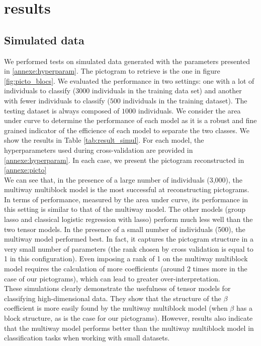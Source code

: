 \documentclass[preprint,12pt]{elsarticle}
\begin{document}
\newpage
\section{results}
\label{sec:results}
\subsection{Simulated data}
\noindent We performed tests on simulated data generated with the parameters presented in \ref{annexe:hyperparam}. The pictogram to retrieve is the one in figure \ref{fig:picto_blocs}. We evaluated the performance in two settings: one with a lot of individuals to classify ($3000$ individuals in the training data set) and another with fewer individuals to classify ($500$ individuals in the training dataset). The testing dataset is always composed of $1000$ individuals. We consider the area under curve to determine the performance of each model as it is a robust and fine grained indicator of the efficience of each model to separate the two classes. We show the results in Table \ref{tab:result_simul}. For each model, the hyperparameters used during cross-validation are provided in \ref{annexe:hyperparam}. In each case, we present the pictogram reconstructed in \ref{annexe:picto}\\
\indent We can see that, in the presence of a large number of individuals (3,000), the multiway multiblock model is the most successful at reconstructing pictograms. In terms of performance, measured by the area under curve, its performance in this setting is similar to that of the multiway model. The other models (group lasso and classical logistic regression with lasso) perform much less well than the two tensor models.
In the presence of a small number of individuals (500), the multiway model performed best. In fact, it captures the pictogram structure in a very small number of parameters (the rank chosen by cross validation is equal to 1 in this configuration). Even imposing a rank of 1 on the multiway multiblock model requires the calculation of more coefficients (around $2$ times more in the case of our pictograms), which can lead to greater over-interpretation.\\
\indent These simulations clearly demonstrate the usefulness of tensor models for classifying high-dimensional data. They show that the structure of the $\beta$ coefficient is more easily found by the multiway multiblock model (when $\beta$ has a block structure, as is the case for our pictograms). However, results also indicate that the multiway model performs better than the multiway multiblock model in classification tasks when working with small datasets.\\
\end{document}
